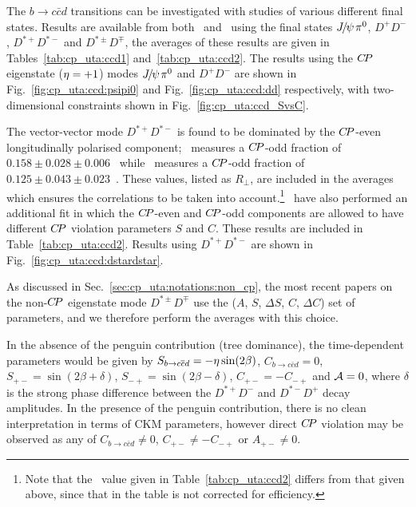 The $b \to c\bar{c}d$ transitions can be investigated with studies 
of various different final states. 
Results are available from both \babar\  and \belle\ 
using the final states ${J\mskip -3mu/\mskip -2mu\psi\mskip 2mu} \pi^0$, $D^+D^-$, 
$D^{*+}D^{*-}$ and $D^{*\pm}D^{\mp}$,
the averages of these results are given in Tables~\ref{tab:cp_uta:ccd1} and~\ref{tab:cp_uta:ccd2}.
The results using the $C\!P$ eigenstate (${\eta} = +1$) modes
${J\mskip -3mu/\mskip -2mu\psi\mskip 2mu} \pi^0$ and $D^+D^-$
are shown in Fig.~\ref{fig:cp_uta:ccd:psipi0} and 
Fig.~\ref{fig:cp_uta:ccd:dd} respectively,
with two-dimensional constraints shown in Fig.~\ref{fig:cp_uta:ccd_SvsC}.

The vector-vector mode $D^{*+}D^{*-}$ 
is found to be dominated by the $C\!P$-even longitudinally polarised component;
\babar\ measures a $C\!P$-odd fraction of 
$0.158 \pm 0.028 \pm 0.006$~\cite{Aubert:2008ah} while
\belle\ measures a $C\!P$-odd fraction of 
$0.125 \pm 0.043 \pm 0.023$~\cite{:2009za}.
These values, listed as $R_\perp$, are included in the averages which ensures
the correlations to be taken into account.\footnote{
  Note that the \babar\ value given in Table~\ref{tab:cp_uta:ccd2} differs from
  that given above, since that in the table is not corrected for efficiency.
}
\babar\ have also performed an additional fit in which the 
$C\!P$-even and $C\!P$-odd components are allowed to have different 
$C\!P$ violation parameters $S$ and $C$.  
These results are included in Table~\ref{tab:cp_uta:ccd2}.
Results using $D^{*+}D^{*-}$ are shown in Fig.~\ref{fig:cp_uta:ccd:dstardstar}.


As discussed in Sec.~\ref{sec:cp_uta:notations:non_cp}, the most recent papers on the non-$C\!P$ eigenstate mode $D^{*\pm}D^{\mp}$ use the ($A$, $S$, $\Delta S$, $C$, $\Delta C$) set of parameters, and we therefore perform the averages with this choice.



In the absence of the penguin contribution (tree dominance),
the time-dependent parameters would be given by
$S_{b \to c\bar c d} = - \etacp \sin(2\beta)$,
$C_{b \to c\bar c d} = 0$,
$S_{+-} = \sin(2\beta + \delta)$,
$S_{-+} = \sin(2\beta - \delta)$,
$C_{+-} = - C_{-+}$ and 
${\cal A} = 0$,
where $\delta$ is the strong phase difference between the 
$D^{*+}D^-$ and $D^{*-}D^+$ decay amplitudes.
In the presence of the penguin contribution,
there is no clean interpretation in terms of CKM parameters,
however
direct $C\!P$ violation may be observed as any of
$C_{b \to c\bar c d} \neq 0$, $C_{+-} \neq - C_{-+}$ or $A_{+-} \neq 0$.

